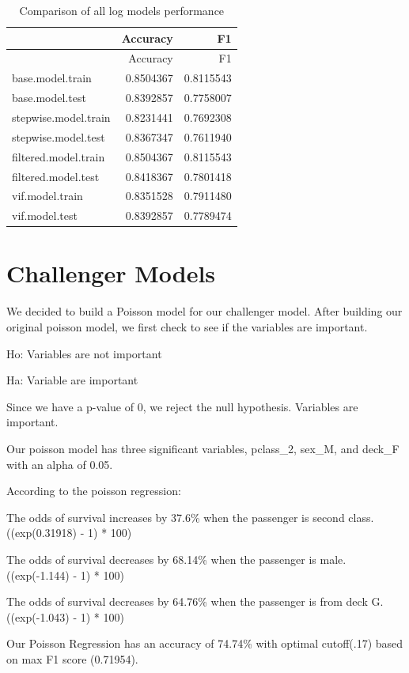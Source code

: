 \documentclass[
  letterpaper,
  DIV=11,
  numbers=noendperiod]{scrartcl}
\begin{document}
\begin{longtable}[]{@{}lrr@{}}
\caption{Comparison of all log models performance}\tabularnewline
\toprule\noalign{}
& Accuracy & F1 \\
\midrule\noalign{}
\endfirsthead
\toprule\noalign{}
& Accuracy & F1 \\
\midrule\noalign{}
\endhead
\bottomrule\noalign{}
\endlastfoot
base.model.train & 0.8504367 & 0.8115543 \\
base.model.test & 0.8392857 & 0.7758007 \\
stepwise.model.train & 0.8231441 & 0.7692308 \\
stepwise.model.test & 0.8367347 & 0.7611940 \\
filtered.model.train & 0.8504367 & 0.8115543 \\
filtered.model.test & 0.8418367 & 0.7801418 \\
vif.model.train & 0.8351528 & 0.7911480 \\
vif.model.test & 0.8392857 & 0.7789474 \\
\end{longtable}

\section{Challenger Models}\label{challenger-models}

We decided to build a Poisson model for our challenger model. After
building our original poisson model, we first check to see if the
variables are important.

Ho: Variables are not important

Ha: Variable are important

Since we have a p-value of 0, we reject the null hypothesis. Variables
are important.

Our poisson model has three significant variables, pclass\_2, sex\_M,
and deck\_F with an alpha of 0.05.

According to the poisson regression:

The odds of survival increases by 37.6\% when the passenger is second
class. ((exp(0.31918) - 1) * 100)

The odds of survival decreases by 68.14\% when the passenger is male.
((exp(-1.144) - 1) * 100)

The odds of survival decreases by 64.76\% when the passenger is from
deck G. ((exp(-1.043) - 1) * 100)

Our Poisson Regression has an accuracy of 74.74\% with optimal
cutoﬀ(.17) based on max F1 score (0.71954).
\end{document}
